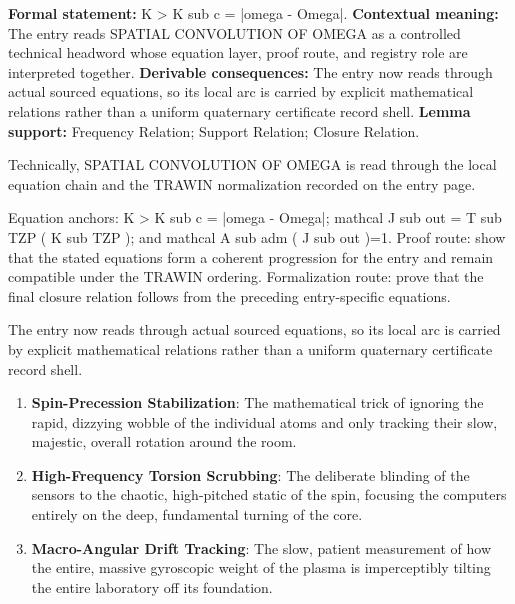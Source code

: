 \begingroup\footnotesize\setlength{\emergencystretch}{3em}\sloppy
\textbf{Formal statement:} K > K sub c = |omega - Omega|. \textbf{Contextual meaning:} The entry reads SPATIAL CONVOLUTION OF OMEGA as a controlled technical headword whose equation layer, proof route, and registry role are interpreted together. \textbf{Derivable consequences:} The entry now reads through actual sourced equations, so its local arc is carried by explicit mathematical relations rather than a uniform quaternary certificate record shell. \textbf{Lemma support:} Frequency Relation; Support Relation; Closure Relation.\par
\endgroup

Technically, SPATIAL CONVOLUTION OF OMEGA is read through the local equation chain and the TRAWIN normalization recorded on the entry page.

Equation anchors: K > K sub c = |omega - Omega|; mathcal J sub out = T sub TZP ( K sub TZP ); and mathcal A sub adm ( J sub out )=1. Proof route: show that the stated equations form a coherent progression for the entry and remain compatible under the TRAWIN ordering. Formalization route: prove that the final closure relation follows from the preceding entry-specific equations.

The entry now reads through actual sourced equations, so its local arc is carried by explicit mathematical relations rather than a uniform quaternary certificate record shell.
\endgroup

\begin{enumerate}[leftmargin=1.6em,itemsep=6pt,topsep=4pt]
\item \textbf{Spin-Precession Stabilization}: The mathematical trick of ignoring the rapid, dizzying wobble of the individual atoms and only tracking their slow, majestic, overall rotation around the room.
\item \textbf{High-Frequency Torsion Scrubbing}: The deliberate blinding of the sensors to the chaotic, high-pitched static of the spin, focusing the computers entirely on the deep, fundamental turning of the core.
\item \textbf{Macro-Angular Drift Tracking}: The slow, patient measurement of how the entire, massive gyroscopic weight of the plasma is imperceptibly tilting the entire laboratory off its foundation.
\end{enumerate}

